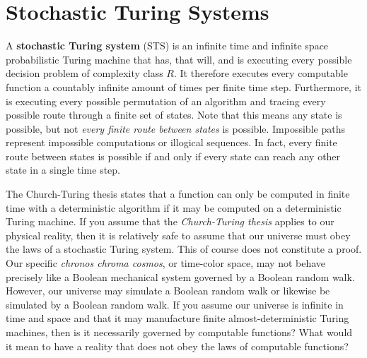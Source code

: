 \documentclass[10pt, a5paper, twoside, openright]{memoir}
\begin{document}
\section{Stochastic Turing Systems}
A \textbf{stochastic Turing system} (STS) is an infinite time and infinite space probabilistic Turing machine that has, that will, and is executing every possible decision problem of complexity class $R$. It therefore executes every computable function a countably infinite amount of times per finite time step. Furthermore, it is executing every possible permutation of an algorithm and tracing every possible route through a finite set of states. Note that this means any state is possible, but not \textit{every finite route between states} is possible. Impossible paths represent impossible computations or illogical sequences. In fact, every finite route between states is possible if and only if every state can reach any other state in a single time step.

The Church-Turing thesis states that a function can only be computed in finite time with a deterministic algorithm if it may be computed on a deterministic Turing machine. If you assume that the \textit{Church-Turing thesis} applies to our physical reality, then it is relatively safe to assume that our universe must obey the laws of a stochastic Turing system. This of course does not constitute a proof. Our specific \textit{chronos chroma cosmos}, or time-color space, may not behave precisely like a Boolean mechanical system governed by a Boolean random walk. However, our universe may simulate a Boolean random walk or likewise be simulated by a Boolean random walk. If you assume our universe is infinite in time and space and that it may manufacture finite almost-deterministic Turing machines, then is it necessarily governed by computable functions? What would it mean to have a reality that does not obey the laws of computable functions? 
\end{document}
